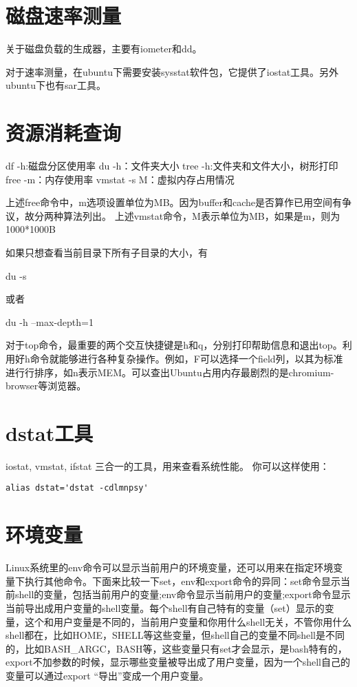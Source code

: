 \section{磁盘速率测量}
关于磁盘负载的生成器，主要有iometer和dd。

对于速率测量，在ubuntu下需要安装sysstat软件包，它提供了iostat工具。另外ubuntu下也有sar工具。
\section{资源消耗查询}
\begin{shellcmd}
 df -h:磁盘分区使用率
 du -h：文件夹大小
 tree -h:文件夹和文件大小，树形打印
 free -m：内存使用率
 vmstat -s M：虚拟内存占用情况
\end{shellcmd}
上述free命令中，m选项设置单位为MB。因为buffer和cache是否算作已用空间有争议，故分两种算法列出。
 上述vmstat命令，M表示单位为MB，如果是m，则为1000*1000B

如果只想查看当前目录下所有子目录的大小，有
\begin{shellcmd}
du -s
\end{shellcmd}
或者
\begin{shellcmd}
du -h --max-depth=1
\end{shellcmd}

对于top命令，最重要的两个交互快捷键是h和q，分别打印帮助信息和退出top。利用好h命令就能够进行各种复杂操作。例如，F可以选择一个field列，以其为标准进行行排序，如n表示MEM。可以查出Ubuntu占用内存最剧烈的是chromium-browser等浏览器。
 




\section{dstat工具}
iostat, vmstat, ifstat 三合一的工具，用来查看系统性能。
你可以这样使用：

\begin{verbatim}
alias dstat='dstat -cdlmnpsy'
\end{verbatim}


\section{环境变量}
Linux系统里的env命令可以显示当前用户的环境变量，还可以用来在指定环境变量下执行其他命令。下面来比较一下set，env和export命令的异同：set命令显示当前shell的变量，包括当前用户的变量;env命令显示当前用户的变量;export命令显示当前导出成用户变量的shell变量。每个shell有自己特有的变量（set）显示的变量，这个和用户变量是不同的，当前用户变量和你用什么shell无关，不管你用什么shell都在，比如HOME，SHELL等这些变量，但shell自己的变量不同shell是不同的，比如BASH\_ARGC，BASH等，这些变量只有set才会显示，是bash特有的，export不加参数的时候，显示哪些变量被导出成了用户变量，因为一个shell自己的变量可以通过export “导出”变成一个用户变量。

